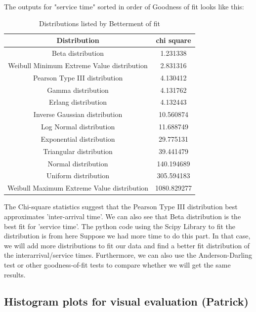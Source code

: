 \documentclass{article}
\begin{document}
The outputs for "service time" sorted in order of Goodness of fit looks like this:


\begin{table}[H]
    \caption{Distributions listed by Betterment of fit}
    \label{tab:Service Best Fit}
    \begin{center}
    \begin{tabular}{c S}
        \toprule
        \textbf{Distribution} & \textbf{chi square}\\
        \midrule
        Beta distribution & 1.231338\\
        Weibull Minimum Extreme Value distribution & 2.831316\\
        Pearson Type III distribution & 4.130412\\
        Gamma distribution & 4.131762\\
        Erlang distribution & 4.132443\\
        Inverse Gaussian distribution & 10.560874\\
        Log Normal distribution & 11.688749\\
        Exponential distribution & 29.775131\\
        Triangular distribution & 39.441479\\
        Normal distribution & 140.194689\\
        Uniform distribution & 305.594183\\
        Weibull Maximum Extreme Value distribution & 1080.829277\\
        \bottomrule
    \end{tabular}
    \end{center}
\end{table}

The Chi-square statistics suggest that the Pearson Type III distribution best approximates 'inter-arrival time'. We can also see that Beta distribution is the best fit for 'service time'. The python code using the Scipy Library to fit the distribution is from here\cite{git} Suppose we had more time to do this part. In that case, we will add more distributions to fit our data and find a better fit distribution of the interarrival/service times. Furthermore, we can also use the Anderson-Darling test or other goodness-of-fit tests to compare whether we will get the same results.

\subsection{Histogram plots for visual evaluation (Patrick)}
\end{document}

